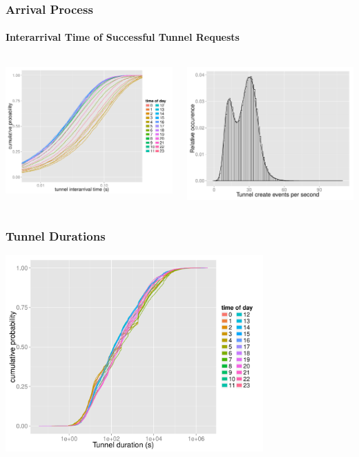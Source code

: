 \documentclass{beamer}
\begin{document}
\begin{frame}
	\frametitle{Arrival Process}
		\framesubtitle{Interarrival Time of Successful Tunnel Requests}
	\begin{columns}[c]
		\begin{column}{7cm}
				\includegraphics[width=7cm]{figures/R-IAT-fromflows-ecdfs-2h.pdf}
		\end{column}
		\begin{column}{7cm}
			\includegraphics[width=7cm]{figures/create_freq.pdf}
		\end{column}
	\end{columns}
\end{frame}

\begin{frame}
	\frametitle{Tunnel Durations}
	\begin{center}
		\includegraphics[height=7.5cm]{figures/R-duration-activetunnels-timeofday-ecdf.pdf}
	\end{center}
\end{frame}
\end{document}
